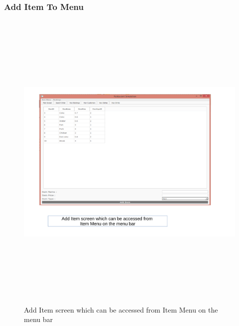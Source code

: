 \begin{landscape}
\subsubsection{Add Item To Menu}
\begin{figure}[H]
    \includegraphics[height = 15cm]{./Maintenance/images/screen5}
    \caption{Add Item screen which can be accessed from Item Menu on the menu bar} \label{fig:screen5}
\end{figure}


\end{landscape}

